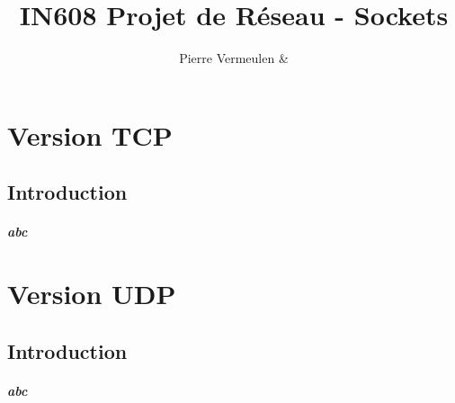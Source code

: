 \documentclass[10pt, a4paper]{report}
\title{\huge \textbf{IN608 Projet de Réseau - Sockets}}
\date{}
\author{Pierre Vermeulen \& }
\begin{document}
	\begin{titlingpage}
		\maketitle
	\end{titlingpage}
	
	\renewcommand\contentsname{Sommaire}
	
	\tableofcontents
	\newpage
	
	\chapter{Version TCP}
	
	\section{Introduction}
	\paragraph{
		abc
	}
	
	\chapter{Version UDP}
	\section{Introduction}
	\paragraph{
		abc
	}
\end{document}
